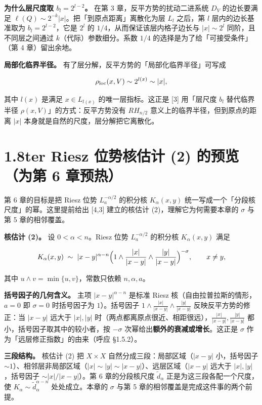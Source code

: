 \documentclass[a4paper,11pt,openany]{ctexbook}
\numberwithin{equation}{chapter}
\numberwithin{figure}{chapter}
\numberwithin{table}{chapter}
\begin{document}
\textbf{为什么层尺度取 $b_l=2^{l-2}$。} 在第 3 章，反平方势的扰动二进系统 $D_V$ 的边长要满足 $\ell(Q)\sim2^{-k}|x|$。把「到原点距离」离散化为层 $L_l$ 之后，第 $l$ 层内的边长基准取为 $b_l=2^{l-2}$，它是 $2^l$ 的 $1/4$，从而保证该层内格子边长与 $|x|\sim2^l$ 同阶，且不同层之间通过 $k$（代际）参数细分。系数 $1/4$ 的选择是为了给「可接受条件」（第 4 章）留出余地。

\textbf{局部化临界半径。} 有了层分解，反平方势的「局部化临界半径」可写成

$$\rho_{\rm loc}(x,V)\sim 2^{l(x)}\sim |x|,$$

其中 $l(x)$ 是满足 $x\in L_{l(x)}$ 的唯一层指标。这正是 [3] 用「层尺度 $b_l$ 替代临界半径 $\rho(x,V)$」的方式：反平方势没有 $RH_{n/2}$ 意义上的临界半径，但到原点的距离 $|x|$ 本身就是自然的尺度，层分解把它离散化。

\section{1.8ter Riesz 位势核估计 (2) 的预览（为第 6 章预热）}

第 6 章的目标是把 Riesz 位势 $L_a^{-\alpha/2}$ 的积分核 $K_\alpha(x,y)$ 统一写成一个「分段核尺度」的幂。这里提前给出 [4,3] 建立的核估计 (2)，理解它为何需要本章的 $\sigma$ 与第 5 章的相邻覆盖。

\textbf{核估计 (2)。} 设 $0<\alpha<n$。Riesz 位势 $L_a^{-\alpha/2}$ 的积分核 $K_\alpha(x,y)$ 满足

$$K_\alpha(x,y)\;\sim\; |x-y|^{\alpha-n}\Bigl(1\wedge \frac{|x|}{|x-y|}\wedge \frac{|y|}{|x-y|}\Bigr)^{-\sigma},\qquad x\neq y,$$

其中 $u\wedge v=\min\{u,v\}$，常数只依赖 $n,\alpha,a$。

\textbf{括号因子的几何含义。} 主项 $|x-y|^{\alpha-n}$ 是标准 Riesz 核（自由拉普拉斯的情形，$a=0$ 即 $\sigma=0$ 时括号因子为 $1$）。括号因子 $1\wedge\frac{|x|}{|x-y|}\wedge\frac{|y|}{|x-y|}$ 反映反平方势的修正：当 $|x-y|$ 远大于 $|x|,|y|$ 时（两点都离原点很近、相距很远），$\frac{|x|}{|x-y|},\frac{|y|}{|x-y|}$ 都小，括号因子取其中的较小者，按 $-\sigma$ 次幂给出\textbf{额外的衰减或增长}。这正是 $\sigma$ 作为「远层修正指数」的由来（呼应 §1.5.2）。

\textbf{三段结构。} 核估计 (2) 把 $X\times X$ 自然分成三段：局部区域（$|x-y|$ 小，括号因子 $\sim1$）、相邻层非局部区域（$|x|\sim|y|\sim|x-y|$）、远层区域（$|x-y|$ 远大于 $|x|,|y|$，括号因子 $\sim|x|/|x-y|$）。第 6 章的分段核尺度 $\widetilde d_\alpha$ 正是为这三段各配一个尺度，使 $K_\alpha\sim\widetilde d_\alpha^{\alpha-n}$ 处处成立。本章的 $\sigma$ 与第 5 章的相邻覆盖是完成这件事的两个前提。
\end{document}

